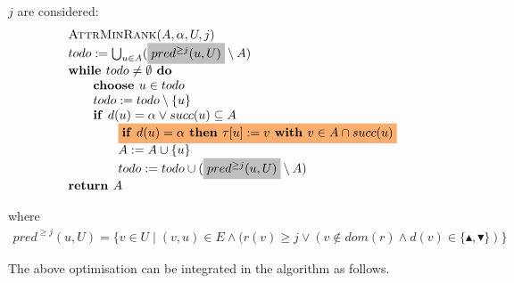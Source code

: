 \documentclass{article}
\newcommand{\If}{\text{\textbf{if }}}
\newcommand{\Do}{\text{\textbf{ do }}}
\newcommand{\Then}{\text{\textbf{ then }}}
\newcommand{\While}{\text{\textbf{while }}}
\newcommand{\Return}{\text{\textbf{return }}}
\newcommand{\With}{\text{\textbf{ with }}}
\begin{document}
$j$ are considered:
\begin{equation*}
\begin{array}{l}
\text{\textsc{AttrMinRank}}(A, \alpha, U, j) \\
todo := \bigcup_{u \in A} (%
\colorbox{lightgray}{$ pred^{\geq j}(u, U) $}%
\setminus A) \\
\While todo \neq \emptyset \Do \\
\qquad \textbf{choose } u \in todo \\
\qquad todo := todo \setminus \{u\} \\
\qquad \If d(u) = \alpha \vee succ(u) \subseteq A \\
\qquad \qquad \colorbox{Apricot}{$ \If d(u) = \alpha \Then \tau
\lbrack u]:=v\With v\in A\cap succ(u) $}\\ 
\qquad \qquad A := A \cup \{u \} \\
\qquad \qquad todo := todo \cup (%
\colorbox{lightgray}{$ pred^{\geq j}(u, U) $}%
\setminus A)  \\
\Return A
\end{array}
\end{equation*}

where
\begin{eqnarray*}
pred^{\geq j}(u, U) = \{v \in U \mid (v,u) \in E \wedge (r(v) \ge j \vee (v \notin dom(r) \wedge d(v) \in \{\blacktriangle,\blacktriangledown\}) \}
\end{eqnarray*}%

The above optimisation can be integrated in the algorithm as follows.
\end{document}
